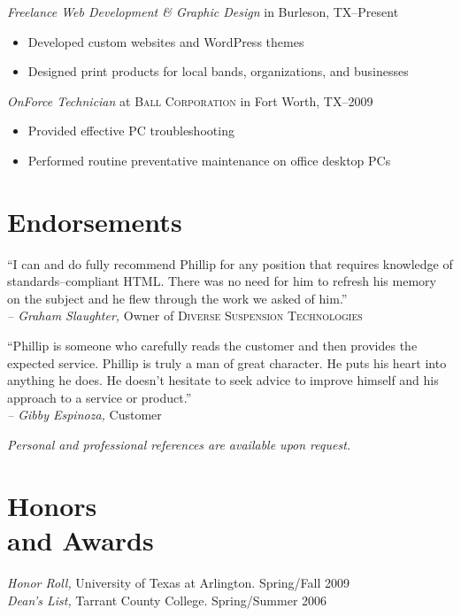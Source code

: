\documentclass[margin]{res}
\begin{document}
\begin{resume}
                \textit{Freelance Web Development \textrm{\&} Graphic Design}
                in Burleson, TX--Present
                \begin{itemize} \itemsep -2pt %
                  \item Developed custom websites and WordPress themes
                  \item Designed print products for local bands, organizations, and businesses
                \end{itemize}
                
                \textit{OnForce Technician}
                at \textsc{Ball Corporation} in Fort Worth, TX--2009
                \begin{itemize} \itemsep -2pt %
                  \item Provided effective PC troubleshooting
                  \item Performed routine preventative maintenance on office desktop PCs
                \end{itemize}

      
\section{\textsf{Endorsements}}

                ``I can and do fully recommend Phillip for any position that requires 
                knowledge of standards--compliant HTML. There was no need for him to refresh his 
                memory on the subject and he flew through the work we asked of him.''             \\
                \textit{-- Graham Slaughter,} Owner of \textsc{Diverse Suspension Technologies}

                ``Phillip is someone who carefully reads the customer and then 
                provides the expected service. Phillip is truly a man of great character. 
                He puts his heart into anything he does. He doesn't hesitate to seek advice 
                to improve himself and his approach to a service or product.''                    \\
                \textit{-- Gibby Espinoza,} Customer
                
                \textit{Personal and professional references are available upon request.}


\section{\textsf{Honors \\and Awards}}
                
                \textit{Honor Roll,} University of Texas at Arlington. Spring/Fall 2009 \\
                \textit{Dean's List,} Tarrant County College. Spring/Summer 2006
                
\end{resume}
\end{document}
